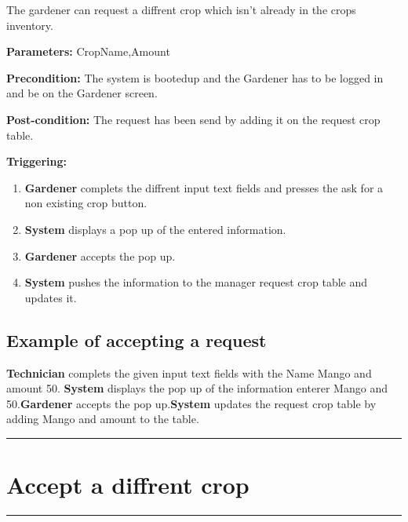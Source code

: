 The gardener can request a diffrent crop which isn't already in the crops
inventory.
\begin{description}
\item \textbf{Parameters:} CropName,Amount
\item \textbf{Precondition:} The system is bootedup and the Gardener has to be
logged in and be on the Gardener screen.
\item \textbf{Post-condition:} The request has been send by adding it on the
request crop table.
\item \textbf{Triggering:}
\begin{enumerate}
\item \textbf{Gardener} complets the diffrent input text fields and presses
the ask for a non existing crop button.
\item \textbf{System} displays a pop up of the entered information.
\item \textbf{Gardener} accepts the pop up.
\item \textbf{System} pushes the information to the manager request crop table
and updates it.
\end{enumerate}
\end{description}

\subsection{Example of accepting a request}
\textbf{Technician} complets the given input text fields with the Name Mango and
amount 50. \textbf{System} displays the pop up of the information enterer Mango
and 50.\textbf{Gardener} accepts the pop up.\textbf{System} updates the request
crop table by adding Mango and amount to the table.
\hfill
\vspace{0.5cm}
\hrule

\break
\section{Accept a diffrent crop}

\hrule
\hfill
\vspace{0.5cm}

\label{operation:Accept a diffrent crop}

